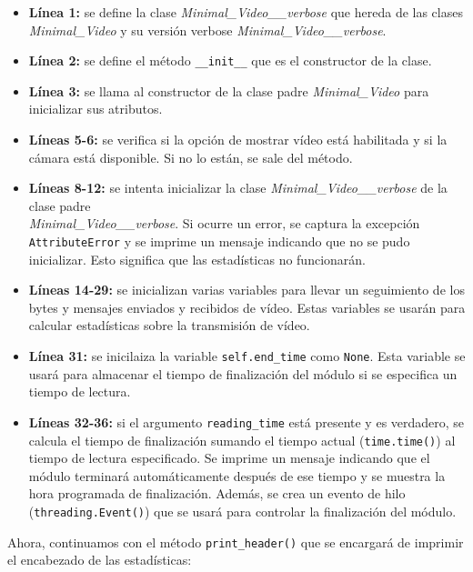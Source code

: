 \begin{itemize}
    \item \textbf{Línea 1:} se define la clase \textit{Minimal\_Video\_\_verbose} que hereda de las clases \textit{Minimal\_Video} y su versión verbose \textit{Minimal\_Video\_\_verbose}.
    \item \textbf{Línea 2:} se define el método \texttt{\_\_init\_\_} que es el constructor de la clase.
    \item \textbf{Línea 3:} se llama al constructor de la clase padre \textit{Minimal\_Video} para inicializar sus atributos.
    \item \textbf{Líneas 5-6:} se verifica si la opción de mostrar vídeo está habilitada y si la cámara está disponible. Si no lo están, se sale del método.
    \item \textbf{Líneas 8-12:} se intenta inicializar la clase \textit{Minimal\_Video\_\_verbose} de la clase padre \\
    \textit{Minimal\_Video\_\_verbose}. Si ocurre un error, se captura la excepción \texttt{AttributeError} y se imprime un mensaje indicando que no se pudo inicializar. Esto significa que las estadísticas no funcionarán.
    \item \textbf{Líneas 14-29:} se inicializan varias variables para llevar un seguimiento de los bytes y mensajes enviados y recibidos de vídeo. Estas variables se usarán para calcular estadísticas sobre la transmisión de vídeo.
    \item \textbf{Línea 31:} se inicilaiza la variable \texttt{self.end\_time} como \texttt{None}. Esta variable se usará para almacenar el tiempo de finalización del módulo si se especifica un tiempo de lectura.
    \item \textbf{Líneas 32-36:} si el argumento \texttt{reading\_time} está presente y es verdadero, se calcula el tiempo de finalización sumando el tiempo actual (\texttt{time.time()}) al tiempo de lectura especificado. Se imprime un mensaje indicando que el módulo terminará automáticamente después de ese tiempo y se muestra la hora programada de finalización. Además, se crea un evento de hilo (\texttt{threading.Event()}) que se usará para controlar la finalización del módulo.
\end{itemize}

Ahora, continuamos con el método \texttt{print\_header()} que se encargará de imprimir el encabezado de las estadísticas:

